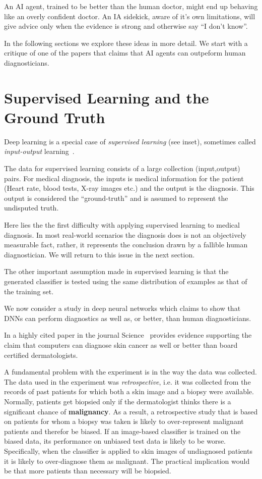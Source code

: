 \documentclass[11pt]{pnas-new}
\begin{document}
An AI agent, trained to be better than the human doctor, might end up
behaving like an overly confident doctor. An IA sidekick, aware of
it's own limitations, will give advice only when the evidence is
strong and otherwise say ``I don't know''.

In the following sections we explore these ideas in more detail. We
start with a critique of one of the papers that claims that AI agents
can outpeform human diagnosticians.

\section{Supervised Learning and the Ground Truth}
\label{sec:ground-truth}

Deep learning is a special case of {\em supervised learning} (see
inset), sometimes called {\em input-output}
learning~\cite{ng2016artificial,topol2019deep}.

The data for supervised learning consists of a large collection
(input,output) pairs. For medical diagnosis, the inputs is medical
information for the patient (Heart rate, blood tests, X-ray images
etc.) and the output is the diagnosis. This output is considered the
``ground-truth'' and is assumed to represent the undisputed truth.

Here lies the the first difficulty with applying supervised learning
to medical diagnosis. In most real-world scenarios the diagnosis
does is not an objectively measurable fact, rather, it
represents the conclusion drawn by a fallible human diagnostician. We  will
return to this issue in the next section.

The other important assumption made in supervised learning is that the
generated classifier is tested using the same distribution of examples
as that of the training set.

We now consider a study in deep neural networks which claims to show
that DNNs can perform diagnostics as well as, or better, than human diagnosticians. 

In a highly cited paper in the journal
Science~\cite{esteva2017dermatologist} provides evidence supporting
the claim that computers can diagnose skin cancer as well or better than board
certified dermatologists.

A fundamental problem with the experiment is in the way the data was
collected. The data used in the experiment was {\em retrospective},
i.e. it was collected from the records of past patients for which both
a skin image and a biopsy were available. Normally, patients get
biopsied only if the dermatologist thinks there is a significant
chance of {\bf malignancy}. As a result, a retrospective study that is
based on patients for whom a biopsy was taken is likely to
over-represent malignant patients and therefor be biased. If an image-based classifier
is trained on the biased data, its performance on unbiased test data
is likely to be worse. Specifically, when the classifier is applied to skin
images of undiagnosed patients it is likely to over-diagnose them as
malignant. The practical implication would be that more patients than
necessary will be biopsied.
%
\end{document}
